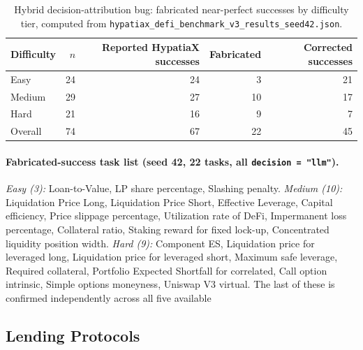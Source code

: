 

\begin{table}[h]
\centering
\caption{Hybrid decision-attribution bug: fabricated near-perfect successes by
difficulty tier, computed from \texttt{hypatiax\_defi\_benchmark\_v3\_results\_seed42.json}.}
\label{tab:hybrid-bug-breakdown}
\begin{tabular}{lrrrr}
\toprule
Difficulty & $n$ & Reported HypatiaX successes & Fabricated & Corrected successes \\
\midrule
Easy    & 24 & 24 & 3 & 21 \\
Medium  & 29 & 27 & 10 & 17 \\
Hard    & 21 & 16 & 9 & 7 \\
\midrule
Overall & 74 & 67 & 22 & 45 \\
\bottomrule
\end{tabular}
\end{table}

\paragraph{Fabricated-success task list (seed 42, 22 tasks, all
\texttt{decision = "llm"}).} \emph{Easy (3):} Loan-to-Value, LP share
percentage, Slashing penalty. \emph{Medium (10):} Liquidation Price Long,
Liquidation Price Short, Effective Leverage, Capital efficiency, Price
slippage percentage, Utilization rate of DeFi, Impermanent loss percentage,
Collateral ratio, Staking reward for fixed lock-up, Concentrated liquidity
position width. \emph{Hard (9):} Component ES, Liquidation price for
leveraged long, Liquidation price for leveraged short, Maximum safe
leverage, Required collateral, Portfolio Expected Shortfall for correlated,
Call option intrinsic, Simple options moneyness, Uniswap V3 virtual.
The last of these is confirmed independently across all five available

\subsection{Lending Protocols}\label{subsec:lending-protocols}
\label{sec:bench_lending}

